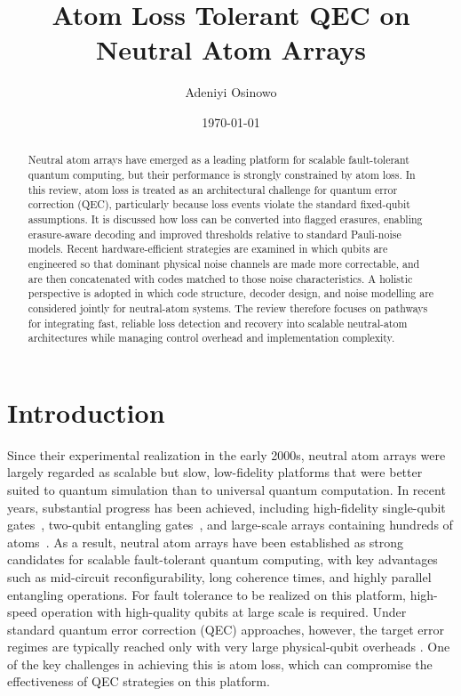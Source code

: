 \documentclass{article}
\title{Atom Loss Tolerant QEC on Neutral Atom Arrays}
\author{Adeniyi Osinowo}
\date{\today}
\begin{document}
\maketitle

\begin{abstract}
Neutral atom arrays have emerged as a leading platform for scalable fault-tolerant quantum computing, but their performance is strongly constrained by atom loss.
In this review, atom loss is treated as an architectural challenge for quantum error correction (QEC), particularly because loss events violate the standard fixed-qubit assumptions.
It is discussed how loss can be converted into flagged erasures, enabling erasure-aware decoding and improved thresholds relative to standard Pauli-noise models.
Recent hardware-efficient strategies are examined in which qubits are engineered so that dominant physical noise channels are made more correctable, and are then concatenated with codes matched to those noise characteristics.
A holistic perspective is adopted in which code structure, decoder design, and noise modelling are considered jointly for neutral-atom systems.
The review therefore focuses on pathways for integrating fast, reliable loss detection and recovery into scalable neutral-atom architectures while managing control overhead and implementation complexity.
\end{abstract}

\section{Introduction} 
Since their experimental realization in the early 2000s, neutral atom arrays were largely regarded as scalable but slow, low-fidelity platforms that were better suited to quantum simulation than to universal quantum computation. %
In recent years, substantial progress has been achieved, including high-fidelity single-qubit gates~\cite{PhysRevLett.121.240501}, two-qubit entangling gates~\cite{Cesa_2017}, and large-scale arrays containing hundreds of atoms~\cite{bluvstein2024logical}.
As a result, neutral atom arrays have been established as strong candidates for scalable fault-tolerant quantum computing, with key advantages such as mid-circuit reconfigurability, long coherence times, and highly parallel entangling operations.
For fault tolerance to be realized on this platform, high-speed operation with high-quality qubits at large scale is required.
Under standard quantum error correction (QEC) approaches, however, the target error regimes are typically reached only with very large physical-qubit overheads \cite{Fowler2012SurfaceCodes, Riverlane2025QEC}.
One of the key challenges in achieving this is atom loss, which can compromise the effectiveness of QEC strategies on this platform. \\
\end{document}
